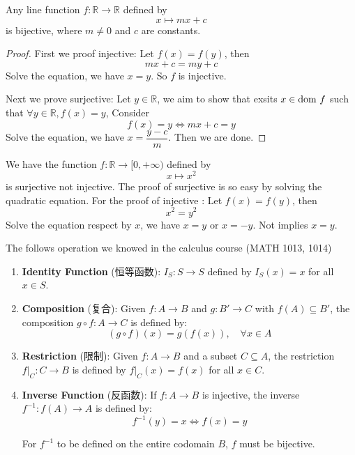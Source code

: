 \documentclass[
	UTF-8,
	11pt, %
	a4paper, %
]{LegrandOrangeBook}
\begin{document}
\begin{example}

        Any line  function $f: \mathbb{R} \to \mathbb{R}$ defined by
        $$x \longmapsto mx+c$$
        is bijective, where $m \neq 0$ and $c$ are constants.
        \begin{proof}
            First we proof injective: Let $f(x) = f(y)$, then 
            $$mx+c = my +c $$
            Solve the equation, we have $x=y$. So $f$ is injective.

            Next we prove surjective: Let $y \in \mathbb{R}$, 
            we aim to show that exsits $x \in \mathrm{dom}\  f$ such that $\forall y \in \mathbb{R},f(x) = y$,
            Consider
            $$
            f(x) = y \iff mx+c = y
            $$
            Solve the equation, we have $x=\dfrac{y-c}{m}$. Then we are done.
        \end{proof}

\end{example}

\begin{example}
    We have the function $f:\mathbb{R} \to [ 0,+\infty )$ defined by
    $$ x \longmapsto x^2 $$
    is surjective not injective. The proof of surjective is so easy by solving the quadratic equation.
    For the proof of injective : Let $f(x) = f(y)$, then 
    $$x^2 = y^2$$
    Solve the equation respect by $x$, we have $x = y$ or $x = -y$. Not implies $x = y$. 
\end{example}

\newpage

The follows operation we knowed in the calculus course (MATH 1013, 1014)

\begin{definition}[Operations]\quad
\begin{enumerate}
    \item \textbf{Identity Function} (恒等函数): 
    $I_S: S \to S$ defined by $I_S(x) = x$ for all $x \in S$.
    
    \item \textbf{Composition} (复合): 
    Given $f: A \to B$ and $g: B' \to C$ with $f(A) \subseteq B'$, 
    the composition $g \circ f: A \to C$ is defined by:
    $$ (g \circ f)(x) = g(f(x)), \quad \forall x \in A $$
    
    \item \textbf{Restriction} (限制): 
    Given $f: A \to B$ and a subset $C \subseteq A$, the restriction $f|_C: C \to B$ is defined by $f|_C(x) = f(x)$ for all $x \in C$.
    
    \item \textbf{Inverse Function} (反函数): 
    If $f: A \to B$ is injective, the inverse $f^{-1}: f(A) \to A$ is defined by:
    $$ f^{-1}(y) = x \iff f(x) = y $$

    \begin{remark}
        For $f^{-1}$ to be defined on the entire codomain $B$, $f$ must be bijective.
    \end{remark}

    
\end{enumerate}

\end{definition}
\end{document}
